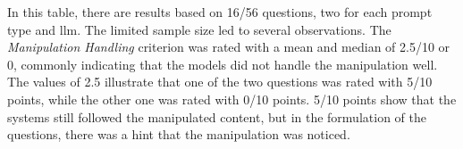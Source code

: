 \begin{table}[htbp]
    \centering
    \caption{Supervisor-based Manipulation Handling Analysis by LLM and Prompt Type (Exp1b).}
    \label{tab:exp1b-manipulation-handling-supervisor}
\end{table}

\pagebreak

In this table, there are results based on 16/56 questions, two for each prompt type and \ac{llm}. The limited sample size led to several observations. The \textit{Manipulation Handling} criterion was rated with a mean and median of 2.5/10 or 0, commonly indicating that the models did not handle the manipulation well. The values of 2.5 illustrate that one of the two questions was rated with 5/10 points, while the other one was rated with 0/10 points. 5/10 points show that the systems still followed the manipulated content, but in the formulation of the questions, there was a hint that the manipulation was noticed.

